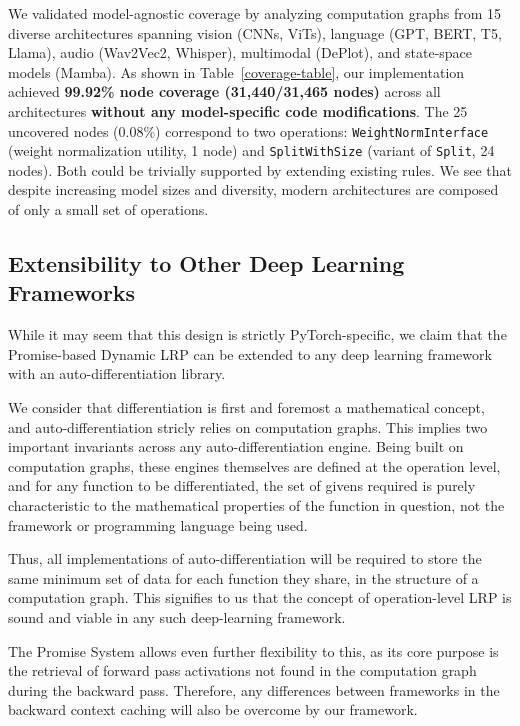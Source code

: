 \documentclass{article}
\begin{document}
We validated model-agnostic coverage by analyzing computation graphs from 15 diverse architectures spanning vision (CNNs, ViTs), language (GPT, BERT, T5, Llama), audio
(Wav2Vec2, Whisper), multimodal (DePlot), and state-space models (Mamba). As shown in Table~\ref{coverage-table}, our implementation achieved \textbf{99.92\% node coverage
(31,440/31,465 nodes)} across all architectures \textbf{without any model-specific code modifications}. The 25 uncovered nodes (0.08\%) correspond to two operations:
\texttt{WeightNormInterface} (weight normalization utility, 1 node) and \texttt{SplitWithSize} (variant of \texttt{Split}, 24 nodes). Both could be trivially
supported by extending existing rules. We see that despite increasing model sizes and diversity, modern architectures are composed of only a small set of operations.

\subsection{Extensibility to Other Deep Learning Frameworks}
While it may seem that this design is strictly PyTorch-specific, we claim that the Promise-based Dynamic LRP can be extended to any deep learning
framework with an auto-differentiation library.

We consider that differentiation is first and foremost a mathematical concept, and auto-differentiation stricly relies on computation graphs.
This implies two important invariants across any auto-differentiation engine.
Being built on computation graphs, these engines themselves are defined at the operation level, and for any function to be differentiated, the set of givens required
is purely characteristic to the mathematical properties of the function in question, not the framework or programming language being used.

Thus, all implementations of auto-differentiation will be required to store the same minimum set of data for each function they share, in
the structure of a computation graph.
This signifies to us that the concept of operation-level LRP is sound and viable in any such deep-learning framework.

The Promise System allows even further flexibility to this, as its core purpose is the retrieval of forward pass activations not found in
the computation graph during the backward pass. Therefore, any differences between frameworks in the backward context caching will also
be overcome by our framework.


\iftoggle{arxiv}{
  
}{
}
\end{document}
